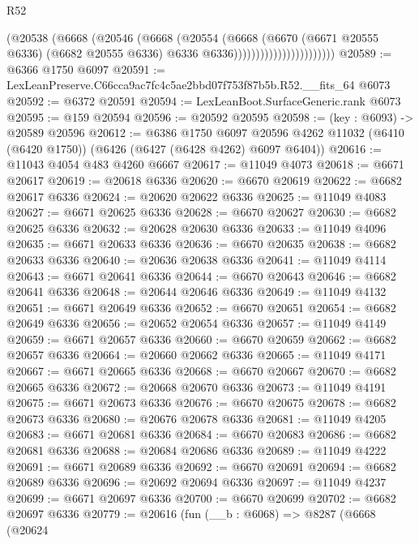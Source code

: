 \begin{lexlean}{R52}
\begin{coremodule}
                                    (@20538
                                      (@6668
                                        (@20546
                                          (@6668
                                            (@20554
                                              (@6668
                                                (@6670
                                                  (@6671 @20555 @6336)
                                                  (@6682 @20555 @6336)
                                                  @6336
                                                  @6336)))))))))))))))))))))))
@20589 := @6366 @1750 @6097
@20591 := LexLeanPreserve.C66cca9ac7fc4c5ae2bbd07f753f87b5b.R52.__fits_64 @6073
@20592 := @6372 @20591
@20594 := LexLeanBoot.SurfaceGeneric.rank @6073
@20595 := @159 @20594
@20596 := @20592 @20595
@20598 := (key : @6093) -> @20589 @20596
@20612 := @6386
    @1750
    @6097
    @20596
    @4262
    @11032
    (@6410 (@6420 @1750))
    (@6426 (@6427 (@6428 @4262) @6097 @6404))
@20616 := @11043 @4054 @483 @4260 @6667
@20617 := @11049 @4073
@20618 := @6671 @20617
@20619 := @20618 @6336
@20620 := @6670 @20619
@20622 := @6682 @20617 @6336
@20624 := @20620 @20622 @6336
@20625 := @11049 @4083
@20627 := @6671 @20625 @6336
@20628 := @6670 @20627
@20630 := @6682 @20625 @6336
@20632 := @20628 @20630 @6336
@20633 := @11049 @4096
@20635 := @6671 @20633 @6336
@20636 := @6670 @20635
@20638 := @6682 @20633 @6336
@20640 := @20636 @20638 @6336
@20641 := @11049 @4114
@20643 := @6671 @20641 @6336
@20644 := @6670 @20643
@20646 := @6682 @20641 @6336
@20648 := @20644 @20646 @6336
@20649 := @11049 @4132
@20651 := @6671 @20649 @6336
@20652 := @6670 @20651
@20654 := @6682 @20649 @6336
@20656 := @20652 @20654 @6336
@20657 := @11049 @4149
@20659 := @6671 @20657 @6336
@20660 := @6670 @20659
@20662 := @6682 @20657 @6336
@20664 := @20660 @20662 @6336
@20665 := @11049 @4171
@20667 := @6671 @20665 @6336
@20668 := @6670 @20667
@20670 := @6682 @20665 @6336
@20672 := @20668 @20670 @6336
@20673 := @11049 @4191
@20675 := @6671 @20673 @6336
@20676 := @6670 @20675
@20678 := @6682 @20673 @6336
@20680 := @20676 @20678 @6336
@20681 := @11049 @4205
@20683 := @6671 @20681 @6336
@20684 := @6670 @20683
@20686 := @6682 @20681 @6336
@20688 := @20684 @20686 @6336
@20689 := @11049 @4222
@20691 := @6671 @20689 @6336
@20692 := @6670 @20691
@20694 := @6682 @20689 @6336
@20696 := @20692 @20694 @6336
@20697 := @11049 @4237
@20699 := @6671 @20697 @6336
@20700 := @6670 @20699
@20702 := @6682 @20697 @6336
@20779 := @20616
    (fun (__b : @6068) =>
    @8287
      (@6668
        (@20624

\end{coremodule}
\end{lexlean}
